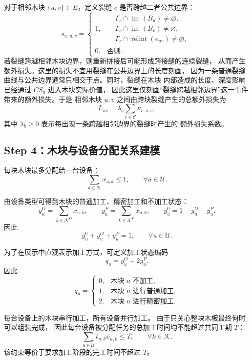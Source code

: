 ﻿\documentclass[UTF8,12pt,a4paper]{ctexart}
\begin{document}
\begin{description}[leftmargin=2em,labelsep=0.5em,itemsep=0.6em]
  \item[\textbf{跨块裂缝判定：}]
对于相邻木块 \(\{u,v\}\in E\)，定义裂缝 \(c\) 是否跨越二者公共边界：
\[
\kappa_{c,u,v}
=
\begin{cases}
1, &
\begin{aligned}
&\Gamma_c\cap\operatorname{int}(B_u)\ne\varnothing,\\[-0.2em]
&\Gamma_c\cap\operatorname{int}(B_v)\ne\varnothing,\\[-0.2em]
&\Gamma_c\cap\operatorname{relint}(e_{uv})\ne\varnothing,
\end{aligned}\\[0.8em]
0, & \text{否则}.
\end{cases}
\]
若裂缝跨越相邻木块边界，则重新拼接后可能形成跨接缝的连续裂缝，
从而产生额外损失。这里的损失不宜用裂缝在公共边界上的长度刻画，
因为一条普通裂缝曲线与公共边界通常只相交于点。同时，裂缝在木块
内部造成的长度、深度影响已经通过 \(CS_u\) 进入木块实际价值，
因此这里仅刻画“裂缝跨越相邻边界”这一事件带来的额外损失。于是
相邻木块 \(u,v\) 之间由跨块裂缝产生的总额外损失为
\[
L_{uv}
=
\lambda_b
\sum_{c\in\mathcal C}
\kappa_{c,u,v},
\]
其中 \(\lambda_b\ge0\) 表示每出现一条跨越相邻边界的裂缝时产生的
额外损失系数。
\end{description}

\subsection{Step 4：木块与设备分配关系建模}

\begin{description}[leftmargin=2em,labelsep=0.5em,itemsep=0.6em]
  \item[\textbf{唯一分配约束：}]
每块木块最多分配给一台设备：
\[
\boxed{
\sum_{k\in\mathcal K}x_{u,k}\le1,
\qquad \forall u\in\mathcal U.
}
\]

  \item[\textbf{加工状态变量：}]
由设备类型可得到木块的普通加工、精密加工和不加工状态：
\[
y_u^O=\sum_{k\in\mathcal K^O}x_{u,k},
\qquad
y_u^P=\sum_{k\in\mathcal K^P}x_{u,k},
\qquad
y_u^0=1-y_u^O-y_u^P.
\]
因此
\[
\boxed{
y_u^0+y_u^O+y_u^P=1,
\qquad \forall u\in\mathcal U.
}
\]

  \item[\textbf{加工状态编码：}]
为了在展示中直观表示加工方式，可定义加工状态编码
\[
q_u=y_u^O+2y_u^P.
\]
因此
\[
q_u=
\begin{cases}
0, & \text{木块 \(u\) 不加工},\\
1, & \text{木块 \(u\) 进行普通加工},\\
2, & \text{木块 \(u\) 进行精密加工}.
\end{cases}
\]

  \item[\textbf{设备时间约束：}]
每台设备上的木块串行加工，所有设备并行加工。
由于只关心整块木板最终何时可以组装完成，
因此每台设备被分配任务的总加工时间均不能超过共同工期 \(T\)：
\[
\boxed{
\sum_{u\in\mathcal U}
\widehat t_{u,k}x_{u,k}
\le T,
\qquad \forall k\in\mathcal K.
}
\]
该约束等价于要求加工阶段的完工时间不超过 \(T\)。
\end{description}
\end{document}

